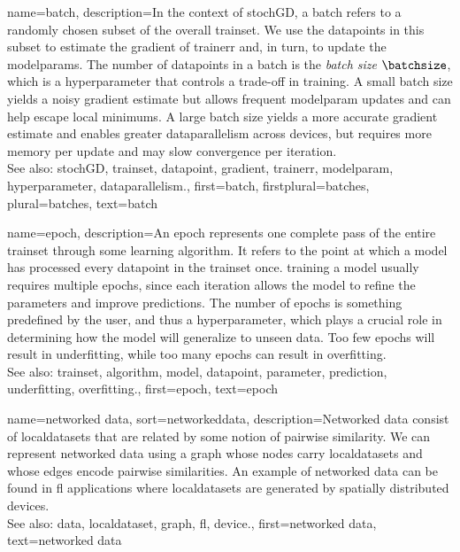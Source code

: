{name={batch},
	description={In the context of \gls{stochGD}, a batch refers to a randomly 
		chosen subset of the overall \gls{trainset}. We use the \glspl{datapoint} in this subset 
		to estimate the \gls{gradient} of \gls{trainerr} and, in turn, to update the \glspl{modelparam}.
		The number of \glspl{datapoint} in a batch is the \emph{batch size} $\batchsize$,
		which is a \gls{hyperparameter} that controls a trade-off in \gls{training}.
		A small batch size yields a noisy \gls{gradient} estimate but allows
		frequent \gls{modelparam} updates and can help escape local \glspl{minimum}.
		A large batch size yields a more accurate \gls{gradient} estimate and
		enables greater \gls{dataparallelism} across \glspl{device}, but requires
		more memory per update and may slow \gls{convergence} per \gls{iteration}.
			\\
		See also: \gls{stochGD}, \gls{trainset}, \gls{datapoint}, \gls{gradient}, 
		\gls{trainerr}, \gls{modelparam}, \gls{hyperparameter}, \gls{dataparallelism}.}, 
 	first={batch},
 	firstplural={batches}, 
 	plural={batches}, 
 	text={batch}  
}

{name={epoch},
	description={An epoch represents one complete pass of the entire \gls{trainset} through some learning 
		\gls{algorithm}. It refers to the point at which a \gls{model} has processed every \gls{datapoint} in the \gls{trainset} once. 
		\Gls{training} a \gls{model} usually requires multiple epochs, since each \gls{iteration} allows the \gls{model} to refine the 
		\glspl{parameter} and improve \glspl{prediction}. The number of epochs is something predefined by the user,  
		and thus a \gls{hyperparameter}, which plays a crucial role in determining how the \gls{model} will generalize to unseen \gls{data}. 
		Too few epochs will result in \gls{underfitting}, while too many epochs can result in \gls{overfitting}.
		\\
		See also: \gls{trainset}, \gls{algorithm}, \gls{model}, \gls{datapoint}, \gls{parameter}, \gls{prediction}, \gls{underfitting}, \gls{overfitting}.},
	first={epoch},
	text={epoch}
} 

{name={networked data},
sort={networkeddata},
	description={Networked \gls{data} consist of \glspl{localdataset} 
		that are related by some notion of pairwise similarity. We can represent networked 
		\gls{data} using a \gls{graph} whose nodes carry \glspl{localdataset} and whose edges encode 
		pairwise similarities. An example of networked \gls{data} can be found in \gls{fl} applications 
		where \glspl{localdataset} are generated by spatially distributed \glspl{device}.
			\\
		See also: \gls{data}, \gls{localdataset}, \gls{graph}, \gls{fl}, \gls{device}.}, 
	first={networked data},
	text={networked data}  
}


